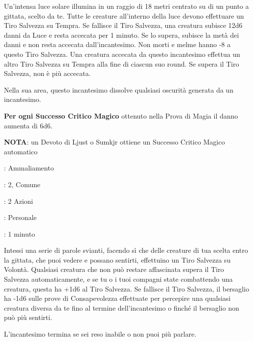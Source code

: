 \begin{multicols}{2}
Un'intensa luce solare illumina in un raggio di 18 metri centrato su di un punto a gittata, scelto da te. Tutte le creature all'interno della luce devono effettuare un Tiro Salvezza su Tempra. Se fallisce il Tiro Salvezza, una creatura subisce 12d6 danni da Luce e resta accecata per 1 minuto. Se lo supera, subisce la metà dei danni e non resta accecata dall'incantesimo. Non morti e melme hanno -8 a questo Tiro Salvezza. Una creatura accecata da questo incantesimo effettua un altro Tiro Salvezza su Tempra alla fine di ciascun suo round. Se supera il Tiro Salvezza, non è più accecata.

Nella sua area, questo incantesimo dissolve qualsiasi oscurità generata da un incantesimo.

\textbf{Per ogni Successo Critico Magico} ottenuto nella Prova di Magia il danno aumenta di 6d6.

\textbf{NOTA}: un Devoto di Ljust o Sumkjr ottiene un Successo Critico Magico automatico

\noindent\colorbox{OBSSgold!10}{
\begin{minipage}{0.95\linewidth}
\begin{description}[noitemsep, topsep=0pt, parsep=0pt, partopsep=0pt, leftmargin=0cm, labelwidth=1.3cm]
	\item[\textbf{Lista}]: Ammaliamento
	\item[\textbf{Livello}]: 2, Comune
	\item[\textbf{Lancio}]: 2 Azioni
	\item[\textbf{Gittata}]: Personale
	\item[\textbf{Durata}]: 1 minuto
\end{description}
\end{minipage}}\smallskip

Intessi una serie di parole svianti, facendo sì che delle creature di tua scelta entro la gittata, che puoi vedere e possano sentirti, effettuino un Tiro Salvezza su Volontà. Qualsiasi creatura che non può restare affascinata supera il Tiro Salvezza automaticamente, e se tu o i tuoi compagni state combattendo una creatura, questa ha +1d6 al Tiro Salvezza. Se fallisce il Tiro Salvezza, il bersaglio ha -1d6 sulle prove di Consapevolezza effettuate per percepire una qualsiasi creatura diversa da te fino al termine dell'incantesimo o finché il bersaglio non può più sentirti.

L'incantesimo termina se sei reso inabile o non puoi più parlare.


\end{multicols}
